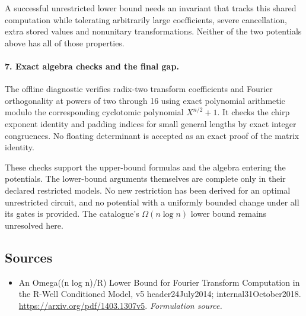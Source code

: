\documentclass[11pt]{article}
\begin{document}
A successful unrestricted lower bound needs an invariant that tracks this shared computation while tolerating arbitrarily large coefficients, severe cancellation, extra stored values and nonunitary transformations. Neither of the two potentials above has all of those properties.

\paragraph{7. Exact algebra checks and the final gap.}
The offline diagnostic verifies radix-two transform coefficients and Fourier orthogonality at powers of two through 16 using exact polynomial arithmetic modulo the corresponding cyclotomic polynomial $X^{n/2}+1$. It checks the chirp exponent identity and padding indices for small general lengths by exact integer congruences. No floating determinant is accepted as an exact proof of the matrix identity.

These checks support the upper-bound formulas and the algebra entering the potentials. The lower-bound arguments themselves are complete only in their declared restricted models. No new restriction has been derived for an optimal unrestricted circuit, and no potential with a uniformly bounded change under all its gates is provided. The catalogue's $\Omega(n\log n)$ lower bound remains unresolved here.

\subsection{Sources}
\begin{itemize}
\item[S1]An Omega((n log n)/R) Lower Bound for Fourier Transform Computation in the R-Well Conditioned Model, v5 header24July2014; internal31October2018.
\url{https://arxiv.org/pdf/1403.1307v5}.
\textit{Formulation source.}
\end{itemize}
\end{document}
